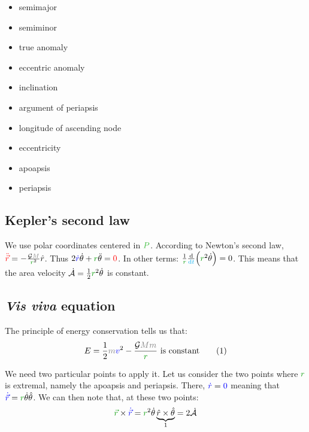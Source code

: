 \begin{itemize}
\item semimajor
\item semiminor
\item true anomaly
\item eccentric anomaly
\item inclination
\item argument of periapsis
\item longitude of ascending node
\item eccentricity
\item apoapsis
\item periapsis
\end{itemize}

\subsection{Kepler's second law}

We use polar coordinates centered in $\posit{P}$. According to Newton's
second law, $\accel{\ddot{\vec r}} = - \frac {\mathcal G \mass{M}}
{\dist{r}^2} \hat r$. Thus $2 \speed{\dot r} \dot \theta + \dist{r}
\ddot \theta = \accel{0}$. In other terms: $\frac 1 {\dist{r}} \frac {\d}
{\delay{\dt}} \Big(\dist{r}^2 \dot \theta\Big) = 0$. This means that the
area velocity $\dot {\mathcal A} = \frac 1 2 \dist{r}^2 \dot \theta$
is constant.

\subsection{\emph{Vis viva} equation}

The principle of energy conservation tells us that:
\[
E
=
\frac 1 2 \mass{m} \speed{v}^2
- \frac {\mathcal G \mass{M} \mass{m}} {\dist{r}}
\text{ is constant}
\eqtag{eql:orbenergy}
\]

We need two particular points to apply it. Let us consider the two points
where $\dist{r}$ is extremal, namely the apoapsis and periapsis. There,
$\textcolor{blue}{\dot r} = \textcolor{blue}{0}$ meaning that $\speed{\dot{\vec r}} = \dist{r}
\dot \theta \hat \theta$. We can then note that, at these two points:
\[
\dist{\vec r} \times \speed{\dot{\vec r}}
=
\dist{r}^2 \dot \theta \underbrace{\hat r \times \hat \theta}_1
= 2 \dot{\mathcal A}
\]

